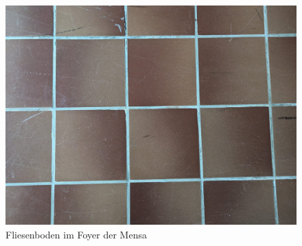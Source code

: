 \documentclass[11pt, a4paper]{article}
\begin{document}
\begin{figure} [ht]
    \centering
    \includegraphics[width=0.4\linewidth]{Images/Fliesenboden.jpg}
    \caption{Fliesenboden im Foyer der Mensa}
    \label{fig:fliesenboden}
\end{figure}
\end{document}
